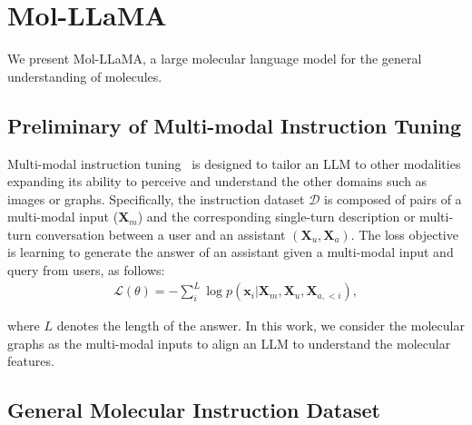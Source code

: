 \vspace{-0.05in}
\section{Mol-LLaMA}
\vspace{-0.05in}
We present Mol-LLaMA, a large molecular language model for the general understanding of molecules. 

\vspace{-0.05in}
\subsection{Preliminary of Multi-modal Instruction Tuning}
\vspace{-0.05in}
Multi-modal instruction tuning~\cite{liu2024LLAVA} is designed to tailor an LLM to other modalities expanding its ability to perceive and understand the other domains such as images or graphs. Specifically, the instruction dataset $\mathcal{D}$ is composed of pairs of a multi-modal input ($\bm X_m$) and the corresponding single-turn description or multi-turn conversation between a user and an assistant $(\bm X_u, \bm X_a)$. The loss objective is learning to generate the answer of an assistant given a multi-modal input and query from users, as follows:
\vspace{-0.2in}
\begin{align}
    \mathcal{L}(\theta) = -\sum^L_i \log p\left(\bm x_i | \bm X_m, \bm X_u, \bm X_{a,<i}\right),
    \label{eq:instruction_tuning}
\end{align}
\vspace{-0.25in}

where $L$ denotes the length of the answer. In this work, we consider the molecular graphs as the multi-modal inputs to align an LLM to understand the molecular features.

\vspace{-0.05in}
\subsection{General Molecular Instruction Dataset}
\vspace{-0.05in}
